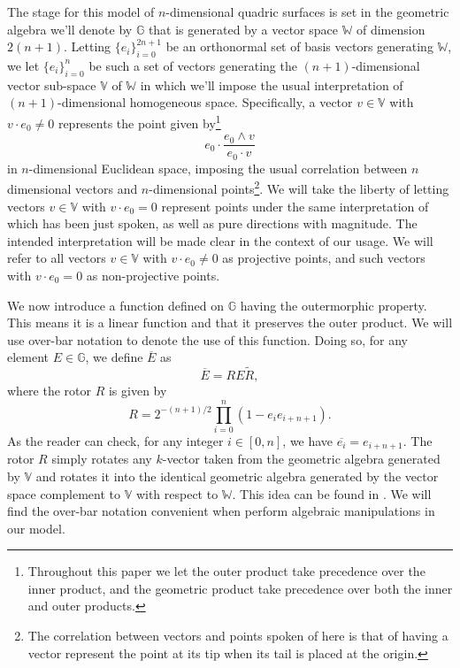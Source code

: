 \documentclass{ecgd-l}
\newcommand{\G}{\mathbb{G}}
\newcommand{\V}{\mathbb{V}}
\newcommand{\W}{\mathbb{W}}
\theoremstyle{definition}
\theoremstyle{remark}
\numberwithin{equation}{section}
\begin{document}
The stage for this model of $n$-dimensional quadric surfaces is set in the geometric
algebra we'll denote by $\G$ that is generated by a vector space $\W$ of dimension
$2(n+1)$.  Letting $\{e_i\}_{i=0}^{2n+1}$ be an orthonormal set of basis vectors
generating $\W$, we let $\{e_i\}_{i=0}^n$ be such a set of vectors generating
the $(n+1)$-dimensional vector sub-space $\V$ of $\W$ in which we'll impose the
usual interpretation of $(n+1)$-dimensional homogeneous space.  Specifically,
a vector $v\in\V$ with $v\cdot e_0\neq 0$ represents the point given by\footnote{Throughout this
paper we let the outer product take precedence over the inner product, and the geometric product
take precedence over both the inner and outer products.}
\begin{equation}
e_0\cdot\frac{e_0\wedge v}{e_0\cdot v}
\end{equation}
in $n$-dimensional Euclidean space, imposing the usual correlation between $n$ dimensional
vectors and $n$-dimensional points\footnote{The correlation between
vectors and points spoken of here is that of having a vector represent the point
at its tip when its tail is placed at the origin.}.  We will take the liberty of letting vectors $v\in\V$ with $v\cdot e_0=0$
represent points under the same interpretation of which has been just spoken, as
well as pure directions with magnitude.  The intended interpretation will be made clear
in the context of our usage.  We will refer to all vectors $v\in\V$ with $v\cdot e_0\neq 0$
as projective points, and such vectors with $v\cdot e_0=0$ as non-projective points.

We now introduce a function defined on $\G$ having the outermorphic property.
This means it is a linear function and that it preserves the outer product.  We will
use over-bar notation to denote the use of this function.  Doing so, for any
element $E\in\G$, we define $\overline{E}$ as
\begin{equation}
\overline{E} = RE\tilde{R},
\end{equation}
where the rotor $R$ is given by
\begin{equation}
R = 2^{-(n+1)/2}\prod_{i=0}^n\left(1-e_ie_{i+n+1}\right).
\end{equation}
As the reader can check, for any integer $i\in[0,n]$, we have $\overline{e_i}=e_{i+n+1}$.
The rotor $R$ simply rotates any $k$-vector taken from the geometric algebra generated
by $\V$ and rotates it into the identical geometric algebra generated by the vector
space complement to $\V$ with respect to $\W$.  This idea can be found in \cite{DoranHestenes93}.
We will find the over-bar notation convenient when perform algebraic manipulations in our model.
\end{document}
